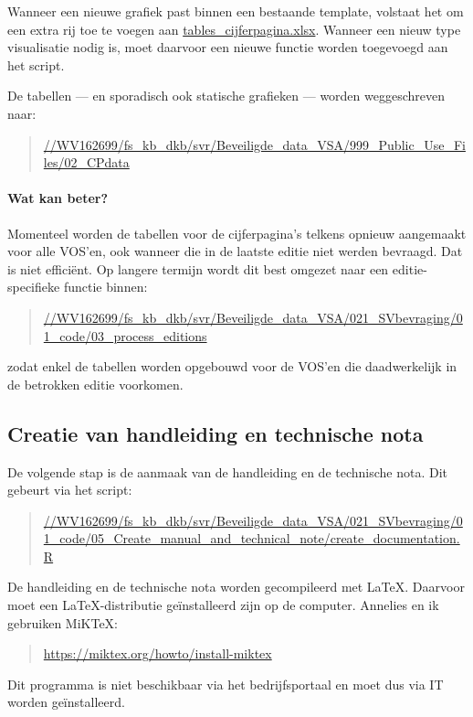 \documentclass{VSAnote}
\begin{document}
Wanneer een nieuwe grafiek past binnen een bestaande template, volstaat het om een extra rij toe te voegen aan \url{tables_cijferpagina.xlsx}. Wanneer een nieuw type visualisatie nodig is, moet daarvoor een nieuwe functie worden toegevoegd aan het script.

De tabellen --- en sporadisch ook statische grafieken --- worden weggeschreven naar:
\begin{quote}
\url{//WV162699/fs_kb_dkb/svr/Beveiligde_data_VSA/999_Public_Use_Files/02_CPdata}
\end{quote}

\paragraph{Wat kan beter?}

Momenteel worden de tabellen voor de cijferpagina's telkens opnieuw aangemaakt voor alle VOS'en, ook wanneer die in de laatste editie niet werden bevraagd. Dat is niet efficiënt. Op langere termijn wordt dit best omgezet naar een editie-specifieke functie binnen:
\begin{quote}
\url{//WV162699/fs_kb_dkb/svr/Beveiligde_data_VSA/021_SVbevraging/01_code/03_process_editions}
\end{quote}
zodat enkel de tabellen worden opgebouwd voor de VOS'en die daadwerkelijk in de betrokken editie voorkomen.




\subsection{Creatie van handleiding en technische nota}

De volgende stap is de aanmaak van de handleiding en de technische nota. Dit gebeurt via het script:
\begin{quote}
\url{//WV162699/fs_kb_dkb/svr/Beveiligde_data_VSA/021_SVbevraging/01_code/05_Create_manual_and_technical_note/create_documentation.R}
\end{quote}

De handleiding en de technische nota worden gecompileerd met \LaTeX. Daarvoor moet een \LaTeX-distributie geïnstalleerd zijn op de computer. Annelies en ik gebruiken MiKTeX:
\begin{quote}
\url{https://miktex.org/howto/install-miktex}
\end{quote}
Dit programma is niet beschikbaar via het bedrijfsportaal en moet dus via IT worden geïnstalleerd.
\end{document}

